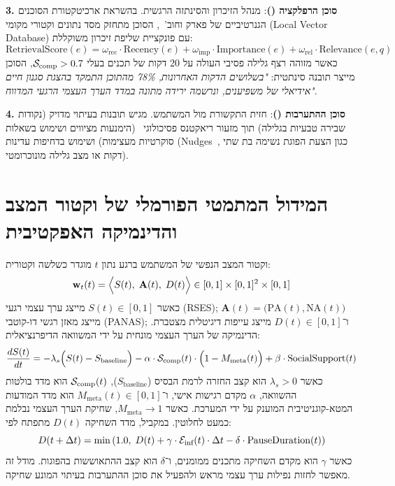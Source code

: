 \textbf{3. סוכן הרפלקציה (\agentReflector{})}: מנהל הזיכרון והסינתזה הרגשית. בהשראת ארכיטקטורת הסוכנים הגנרטיביים של פארק וחוב'~\cite{park2023generative}, הסוכן מתחזק מסד נתונים וקטורי מקומי (\textenglish{Local Vector Database}) עם פונקציית שליפת זיכרון משוקללת:
\begin{equation}
    \text{RetrievalScore}(e) = \omega_{\text{rec}} \cdot \text{Recency}(e) + \omega_{\text{imp}} \cdot \text{Importance}(e) + \omega_{\text{rel}} \cdot \text{Relevance}(e, q)
\end{equation}
כאשר מזוהה רצף גלילה פסיבי העולה על 20 דקות של תכנים בעלי $\mathcal{S}_{\text{comp}} > 0.7$, הסוכן מייצר תובנה סינתטית: \textit{"בשלושים הדקות האחרונות, 78\% מהתוכן התמקד בהצגת סגנון חיים אידיאלי של משפיענים, ונרשמה ירידה מתונה במדד הערך העצמי הרגעי המדווח"}.

\textbf{4. סוכן ההתערבות (\agentInterventionist{})}: חזית התקשורת מול המשתמש. מגיש תובנות בעיתוי מדויק (נקודות שבירה טבעיות בגלילה) תוך מזעור ריאקטנס פסיכולוגי~\cite{brehm1966theory} (הימנעות מציווים ושימוש בשאלות סוקרטיות מעצימות) ושימוש בדחיפות עדינות (\textenglish{Nudges}~\cite{thaler2008nudge}, כגון הצעת הפוגת נשימה בת שתי דקות או מצב גלילה מונוכרומטי).

\section{המידול המתמטי הפורמלי של וקטור המצב והדינמיקה האפקטיבית}
\label{sec:arch_mathematical_modeling}
וקטור המצב הנפשי של המשתמש ברגע נתון $t$ מוגדר כשלשה וקטורית:
\begin{equation}
    \mathbf{w}_t(t) = \Big\langle S(t), \; \mathbf{A}(t), \; D(t) \Big\rangle \in [0, 1] \times [0, 1]^2 \times [0, 1]
\end{equation}
כאשר $S(t) \in [0, 1]$ מייצג ערך עצמי רגעי (\textenglish{RSES}); $\mathbf{A}(t) = \big( \text{PA}(t), \text{NA}(t) \big)$ מייצג מאזן רגשי דו-קוטבי (\textenglish{PANAS}); ו־$D(t) \in [0, 1]$ מייצג עייפות דיגיטלית מצטברת. הדינמיקה של הערך העצמי מונחית על ידי המשוואה הדיפרנציאלית:
\begin{equation}
    \frac{dS(t)}{dt} = -\lambda_s \Big( S(t) - S_{\text{baseline}} \Big) - \alpha \cdot \mathcal{S}_{\text{comp}}(t) \cdot \Big( 1 - M_{\text{meta}}(t) \Big) + \beta \cdot \text{SocialSupport}(t)
\end{equation}
כאשר $\lambda_s > 0$ הוא קצב החזרה לרמת הבסיס ($S_{\text{baseline}}$), $\mathcal{S}_{\text{comp}}(t)$ הוא מדד בולטות ההשוואה, $\alpha$ מקדם רגישות אישי, ו־$M_{\text{meta}}(t) \in [0, 1]$ הוא מדד המודעות המטא-קוגניטיבית המוענק על ידי המערכת. כאשר $M_{\text{meta}} \to 1$, שחיקת הערך העצמי נבלמת כמעט לחלוטין. במקביל, מדד השחיקה $D(t)$ מתפתח לפי:
\begin{equation}
    D(t+\Delta t) = \min\left( 1.0, \; D(t) + \gamma \cdot \mathcal{E}_{\text{inf}}(t) \cdot \Delta t - \delta \cdot \text{PauseDuration}(t) \right)
\end{equation}
כאשר $\gamma$ הוא מקדם השחיקה מתכנים ממומנים, ו־$\delta$ הוא קצב ההתאוששות בהפוגות. מודל זה מאפשר לחזות נפילות ערך עצמי מראש ולהפעיל את סוכן ההתערבות בעיתוי המונע שחיקה.

